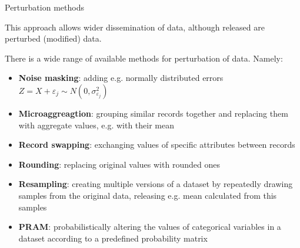 \documentclass[
	aspectratio = 169
 ]{beamer}
\begin{document}
\begin{frame}{Perturbation methods}

This approach allows wider dissemination of data, although released are perturbed (modified) data.

There is a wide range of available methods for perturbation of data. Namely:
\vspace{1em}

\begin{itemize}
\item \textbf{Noise masking}: adding e.g. normally distributed errors \(Z = X + \varepsilon_j \sim N(0, \sigma_{\varepsilon_j}^2)\)
\item \textbf{Microaggreagtion}: grouping similar records together and replacing them with aggregate values, e.g. with their mean
\item \textbf{Record swapping}: exchanging values of specific attributes between records
\item \textbf{Rounding}: replacing original values with rounded ones
\item \textbf{Resampling}: creating multiple versions of a dataset by repeatedly drawing samples from the original data, releasing e.g. mean calculated from this samples
\item \textbf{PRAM}: probabilistically altering the values of categorical variables in a dataset according to a predefined probability matrix
  
\end{itemize}

\end{frame}
\end{document}
